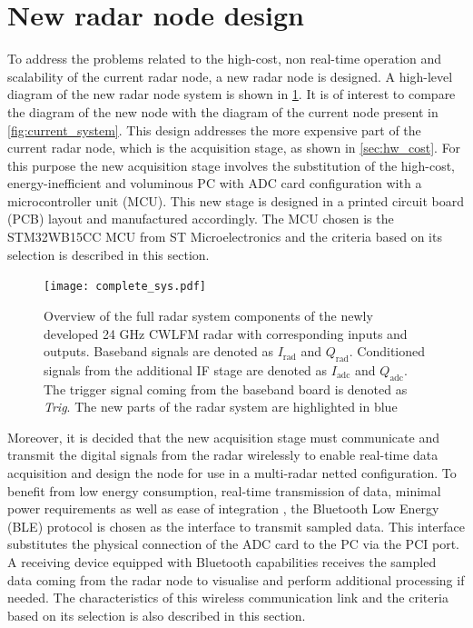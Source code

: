 \section{New radar node design} \label{sec:new_design}

To address the problems related to the high-cost, non real-time operation and scalability of the current radar node, a new radar node is designed. A high-level diagram of the new radar node system is shown in \cref{fig:new_system}. It is of interest to compare the diagram of the new node with the diagram of the current node present in \cref{fig:current_system}. This design addresses the more expensive part of the current radar node, which is the acquisition stage, as shown in \cref{sec:hw_cost}. For this purpose the new acquisition stage involves the substitution of the high-cost, energy-inefficient and voluminous PC with ADC card configuration with a microcontroller unit (MCU). This new stage is designed in a printed circuit board (PCB) layout and manufactured accordingly. The MCU chosen is the STM32WB15CC MCU from ST Microelectronics \cite{STMicroelectronics2022} and the criteria based on its selection is described in this section.

\begin{figure}[ht]
	\centering
	\texttt{[image: complete\_sys.pdf]}
	\caption{Overview of the full radar system components of the newly developed 24 GHz CWLFM radar with corresponding inputs and outputs. Baseband signals are denoted as $I_{\mathrm{rad}}$ and $Q_{\mathrm{rad}}$. Conditioned signals from the additional IF stage are denoted as $I_{\mathrm{adc}}$ and $Q_{\mathrm{adc}}$. The trigger signal coming from the baseband board is denoted as \textit{Trig}. The new parts of the radar system are highlighted in blue \label{fig:new_system}}
\end{figure}

Moreover, it is decided that the new acquisition stage must communicate and transmit the digital signals from the radar wirelessly to enable real-time data acquisition and design the node for use in a multi-radar netted configuration. To benefit from low energy consumption, real-time transmission of data, minimal power requirements as well as ease of integration \cite{Gomez2012}, the Bluetooth Low Energy (BLE) protocol is chosen as the interface to transmit sampled data. This interface substitutes the physical connection of the ADC card to the PC via the PCI port. A receiving device equipped with Bluetooth capabilities receives the sampled data coming from the radar node to visualise and perform additional processing if needed. The characteristics of this wireless communication link and the criteria based on its selection is also described in this section.


